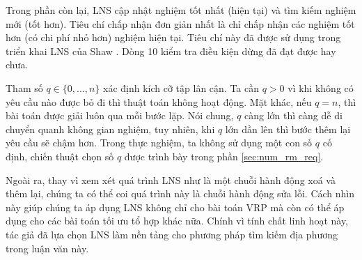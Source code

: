 Trong phần còn lại, LNS cập nhật nghiệm tốt nhất (hiện tại) và tìm kiếm nghiệm mới (tốt hơn). Tiêu chí chấp nhận đơn giản nhất là chỉ chấp nhận các nghiệm tốt hơn (có chi phí nhỏ hơn) nghiệm hiện tại. Tiêu chí này đã được sử dụng trong triển khai LNS của Shaw \cite{shaw1997new}. Dòng 10 kiểm tra điều kiện dừng đã đạt được hay chưa.

Tham số $q \in \{0,...,n\}$ xác định kích cỡ tập lân cận. Ta cần $q > 0$ vì khi không có yêu cầu nào được bỏ đi thì thuật toán không hoạt động. Mặt khác, nếu $q = n$, thì bài toán được giải luôn qua mỗi bước lặp. Nói chung, $q$ càng lớn thì càng dễ di chuyển quanh không gian nghiệm, tuy nhiên, khi $q$ lớn dần lên thì bước thêm lại yêu cầu sẽ chậm hơn. Trong thực nghiệm, ta không sử dụng một con số $q$ cố định, chiến thuật chọn số $q$ được trình bày trong phần \ref{sec:num_rm_req}.

Ngoài ra, thay vì xem xét quá trình LNS như là một chuỗi hành động xoá và thêm lại, chúng ta có thể coi quá trình này là chuỗi hành động sửa lỗi. Cách nhìn này giúp chúng ta áp dụng LNS không chỉ cho bài toán VRP mà còn có thể áp dụng cho các bài toán tối ưu tổ hợp khác nữa. Chính vì tính chất linh hoạt này, tác giả đã lựa chọn LNS làm nền tảng cho phương pháp tìm kiếm địa phương trong luận văn này.



